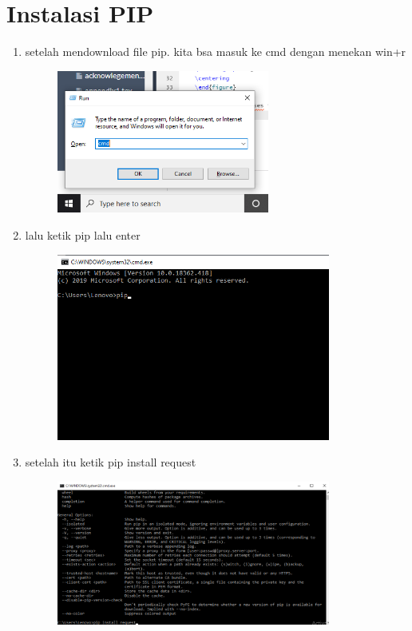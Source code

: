 \section*{Instalasi PIP}

\begin{enumerate}
	\item setelah mendownload file pip. kita bsa masuk ke cmd dengan menekan win+r
	\begin{figure} [h]
	\includegraphics[width=7cm]{section/picpyt/pip/pip1.png}
	\centering
	\end{figure}
	
    \item lalu ketik pip lalu enter
	\begin{figure} [h]
	\includegraphics[width=9cm]{section/picpyt/pip/pip2.png}
	\centering
	\end{figure}
	
	\item setelah itu ketik pip install request
	\begin{figure} [h]
	\includegraphics[width=9cm]{section/picpyt/pip/pip4.png}
	\centering
	\end{figure}
	

\end{enumerate}
